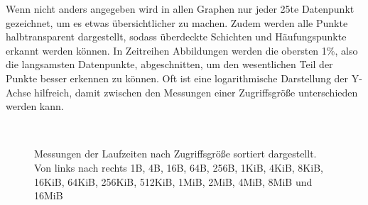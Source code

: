 \documentclass[
	12pt,
	a4paper,
	BCOR10mm,
	DIV14,
	listof=totoc,
	bibliography=totoc,
	headsepline
]{scrreprt}
\begin{document}
Wenn nicht anders angegeben wird in allen Graphen nur jeder 25te Datenpunkt gezeichnet, um es etwas übersichtlicher zu machen.
Zudem werden alle Punkte halbtransparent dargestellt, sodass überdeckte Schichten und Häufungspunkte erkannt werden können.
In Zeitreihen Abbildungen werden die obersten 1\%, also die langsamsten Datenpunkte, abgeschnitten, um den wesentlichen Teil der Punkte besser erkennen zu können.
Oft ist eine logarithmische Darstellung der Y-Achse hilfreich, damit zwischen den Messungen einer Zugriffsgröße unterschieden werden kann. 
\begin{figure}
	\hfill
	\\
	\hfill
	\caption{Messungen der Laufzeiten nach Zugriffsgröße sortiert dargestellt. Von links nach rechts 1B, 4B, 16B, 64B, 256B, 1KiB, 4KiB, 8KiB, 16KiB, 64KiB, 256KiB, 512KiB, 1MiB, 2MiB, 4MiB, 8MiB und 16MiB}
	\label{Laufzeiten_Zeitreihe}
\end{figure} 
\end{document}
